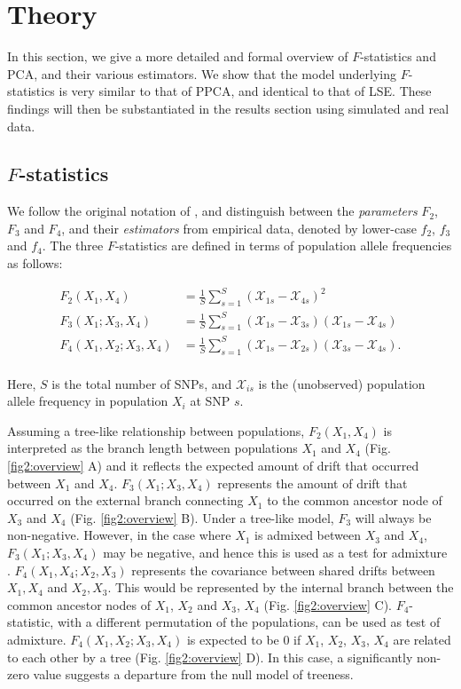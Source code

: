 \documentclass[12pt]{article}
\begin{document}
\section{Theory}\label{theory}
In this section, we give a more detailed and formal overview of $F$-statistics and PCA, and their various estimators. We show that the model underlying $F$-statistics is very similar to that of PPCA, and identical to that of LSE. These findings will then be substantiated in the results section using simulated and real data.

\subsection{$F$-statistics}\label{fstats}
We follow the original notation of \cite{patterson_ancient_2012}, and distinguish between the \textit{parameters} $F_2$, $F_3$ and $F_4$, and their \textit{estimators} from empirical data, denoted by lower-case $f_2$, $f_3$ and $f_4$. The three $F$-statistics are defined in terms of population allele frequencies as follows:

\begin{align}\label{eq:f_intro}
F_2(X_1,X_4) &= \frac{1}{S}\sum_{s=1}^S(\mathcal{X}_{1s} - \mathcal{X}_{4s})^2\nonumber\\
F_3(X_1;X_3,X_4) &= \frac{1}{S}\sum_{s=1}^S(\mathcal{X}_{1s} - \mathcal{X}_{3s})(\mathcal{X}_{1s} - \mathcal{X}_{4s})\nonumber\\
F_4(X_1,X_2;X_3,X_4) &= \frac{1}{S}\sum_{s=1}^S(\mathcal{X}_{1s} - \mathcal{X}_{2s})(\mathcal{X}_{3s} - \mathcal{X}_{4s}).\nonumber\\
\end{align}

Here, $S$ is the total number of SNPs, and $\mathcal{X}_{is}$ is the (unobserved) population allele frequency in population $X_i$ at SNP $s$. 

Assuming a tree-like relationship between populations, $F_2(X_1,X_4)$ is interpreted as the branch length between populations $X_1$ and $X_4$ (Fig. \ref{fig2:overview} A) and it reflects the expected amount of drift that occurred between $X_1$ and $X_4$. $F_3(X_1;X_3,X_4)$ represents the amount of drift that occurred on the external branch connecting $X_1$ to the common ancestor node of $X_3$ and $X_4$ (Fig. \ref{fig2:overview} B). Under a tree-like model, $F_3$ will always be non-negative. However, in the case where $X_1$ is admixed between $X_3$ and $X_4$, $F_3(X_1;X_3,X_4)$ may be negative, and hence this is used as a test for admixture \citep{peter_admixture_2016, patterson_ancient_2012}. $F_4(X_1,X_4;X_2,X_3)$ represents the covariance between shared drifts between $X_1,X_4$ and $X_2,X_3$. This would be represented by the internal branch between the common ancestor nodes of $X_1$, $X_2$ and $X_3$, $X_4$ (Fig. \ref{fig2:overview} C). $F_4$- statistic, with a different permutation of the populations, can be used as test of admixture. $F_4(X_1,X_2;X_3,X_4)$ is expected to be 0 if $X_1$, $X_2$, $X_3$, $X_4$ are related to each other by a tree (Fig. \ref{fig2:overview} D). In this case, a significantly non-zero value suggests a departure from the null model of treeness.
\end{document}
